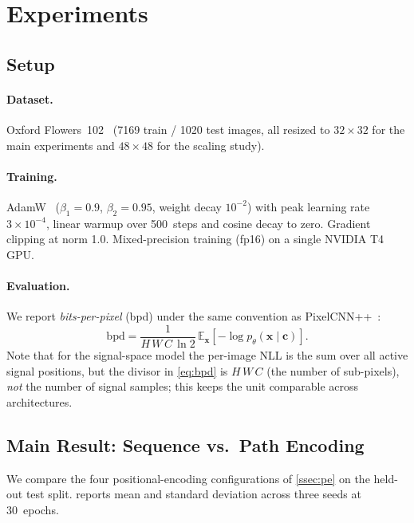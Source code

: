 \documentclass[conference,a4paper]{IEEEtran}
\begin{document}
\section{Experiments}\label{sec:experiments}

\subsection{Setup}

\paragraph{Dataset.}
Oxford Flowers~102~\cite{nilsback2008flowers} (\num{7169} train /
\num{1020} test images, all resized to $32\times32$ for the main
experiments and $48\times48$ for the scaling study).

\paragraph{Training.}
AdamW~\cite{loshchilov2019adamw} ($\beta_1=0.9$, $\beta_2=0.95$,
weight decay $10^{-2}$) with peak learning rate $3\!\times\!10^{-4}$,
linear warmup over 500~steps and cosine decay to zero.
Gradient clipping at norm 1.0. Mixed-precision training (fp16) on a
single NVIDIA T4 GPU.

\paragraph{Evaluation.}
We report \emph{bits-per-pixel} (bpd) under the same convention as
PixelCNN++~\cite{salimans2017pixelcnnpp}:
\begin{equation}\label{eq:bpd}
  \text{bpd} = \frac{1}{H\,W\,C\,\ln 2}\,\mathbb{E}_{\mathbf{x}}\!\left[
    -\log p_\theta(\mathbf{x}\mid\mathbf{c})\right].
\end{equation}
Note that for the signal-space model the per-image NLL is the sum
over all active signal positions, but the divisor in
\cref{eq:bpd} is $H\,W\,C$ (the number of sub-pixels), \emph{not}
the number of signal samples; this keeps the unit comparable across
architectures.

\subsection{Main Result: Sequence vs.\ Path Encoding}\label{ssec:main}

We compare the four positional-encoding configurations of
\cref{ssec:pe} on the held-out test split.  reports
mean and standard deviation across three seeds at 30~epochs.
\end{document}
